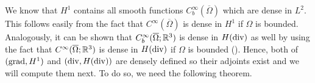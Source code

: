 \documentclass[../master_thesis.tex]{subfiles}
\begin{document}
    



We know that $H^1$ contains all smooth functions 
$C_b^\infty(\overline{\Omega})$ which are dense in $L^2$. This follows easily 
from the fact that $C^\infty(\overline{\Omega})$ is dense in $H^1$ if $\Omega$ is bounded.
Analogously,
it can be shown that $C_b^\infty(\overline{\Omega};\mathbb{R}^3)$ is dense in $H(\operatorname{div})$ as well 
by using the fact that $C^\infty(\overline{\Omega};\mathbb{R}^3)$ is dense in $H(\operatorname{div})$ if $\Omega$
is bounded (\cite[Thm. 3.22]{monk}).
Hence, 
both of $(\operatorname{grad},H^1)$ and $(\operatorname{div},H(\operatorname{div}))$ are densely defined so 
their adjoints exist and we will compute them next. To do so, 
we need the following theorem.
\end{document}
